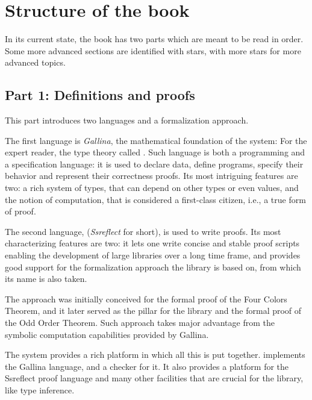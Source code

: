 \section*{Structure of the book}


In its current state, the book has two parts which are meant to be
read in order. Some more advanced sections are identified with stars,
with more stars for more advanced topics.

\subsection*{Part 1: Definitions and proofs}

This part introduces two languages and a formalization approach.

The first language is \emph{Gallina}, the mathematical foundation of the \Coq{}
system:  For the expert reader, the type theory called \mcbCIC{}.  Such
language is both a programming and a specification language: it is used to
declare data, define programs, specify their behavior and represent their
correctness proofs.  Its most intriguing features are two: a rich system of
types, that can depend on other types or even values, and the notion of
computation, that is considered a first-class citizen, i.e., a true form of
proof.

The second language, \mcbSSR{} (\emph{Ssreflect} for short), is used to write
proofs.  Its most characterizing features are two: it lets one write
concise and stable proof scripts enabling the development of large
libraries over a long time frame, and provides good support for the
formalization approach the \mcbMC{} library is based on, from which
its name is also taken.

The \emph{\mcbSSR{}} approach was initially conceived for the formal proof
of the Four Colors Theorem, and it later served as the pillar for
the \mcbMC{} library and the formal proof of the Odd Order Theorem.
Such approach takes major advantage from the symbolic computation
capabilities provided by Gallina.

The \Coq{} system provides a rich platform in which all this is
put together.  \Coq{} implements the Gallina language, and a checker for it.
It also provides a platform for the Ssreflect proof language and
many other facilities that are crucial for the \mcbMC{} library, like
type inference.

